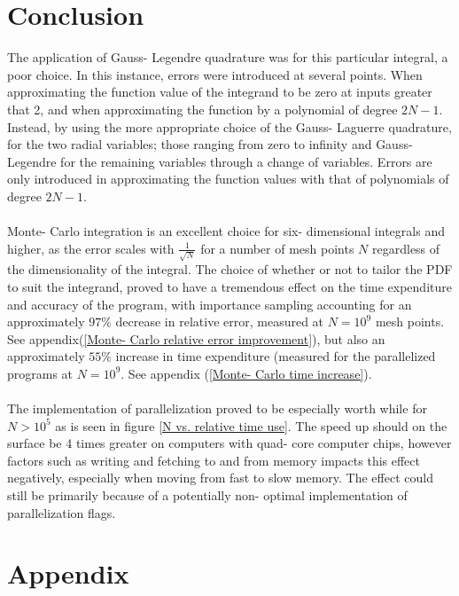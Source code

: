 \documentclass[10pt,a4paper]{article}
\begin{document}
\section{Conclusion}
The application of Gauss- Legendre quadrature was for this particular integral, a poor choice. In this instance, errors were introduced at several points. When approximating the function value of the integrand to be zero at inputs greater that 2, and when approximating the function by a polynomial of degree $2N-1$.\\Instead, by using the more appropriate choice of the Gauss- Laguerre quadrature, for the two radial variables; those ranging from zero to infinity and Gauss- Legendre for the remaining variables through a change of variables. Errors are only introduced in approximating the function values with that of polynomials of degree $2N-1$.\\\\Monte- Carlo integration is an excellent choice for six- dimensional integrals and higher, as the error scales with $\frac{1}{\sqrt{N}}$ for a number of mesh points $N$ regardless of the dimensionality of the integral. The choice of whether or not to tailor the PDF to suit the integrand, proved to have a tremendous effect on the time expenditure and accuracy of the program, with importance sampling accounting for an approximately  $97\%$ decrease in relative error, measured at $N = 10^9$ mesh points. See appendix(\ref{Monte- Carlo relative error improvement}), but also an approximately $55\%$ increase in time expenditure (measured for the parallelized programs at $N = 10^9$. See appendix (\ref{Monte- Carlo time increase}).\\\\The implementation of parallelization proved to be especially worth while for $N>10^5$ as is seen in figure \ref{N vs. relative time use}. The speed up should on the surface be 4 times greater on computers with quad- core computer chips, however factors such as writing and fetching to and from memory impacts this effect negatively, especially when moving from fast to slow memory. The effect could still be primarily because of a potentially non- optimal implementation of parallelization flags.
\section{Appendix}
\end{document}
